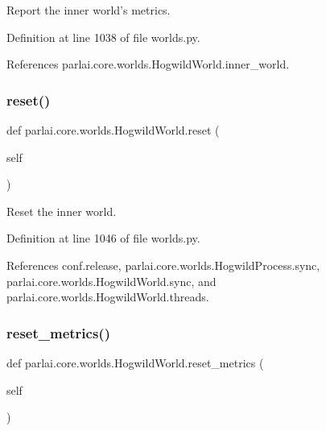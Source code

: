 \begin{DoxyVerb}Report the inner world's metrics.\end{DoxyVerb}
 

Definition at line 1038 of file worlds.\+py.



References parlai.\+core.\+worlds.\+Hogwild\+World.\+inner\+\_\+world.

\mbox{\label{classparlai_1_1core_1_1worlds_1_1HogwildWorld_ae72983e6af34391880979491ced1dde6}} 
\subsubsection{\texorpdfstring{reset()}{reset()}}
{\footnotesize\ttfamily def parlai.\+core.\+worlds.\+Hogwild\+World.\+reset (\begin{DoxyParamCaption}\item[{}]{self }\end{DoxyParamCaption})}

\begin{DoxyVerb}Reset the inner world.\end{DoxyVerb}
 

Definition at line 1046 of file worlds.\+py.



References conf.\+release, parlai.\+core.\+worlds.\+Hogwild\+Process.\+sync, parlai.\+core.\+worlds.\+Hogwild\+World.\+sync, and parlai.\+core.\+worlds.\+Hogwild\+World.\+threads.

\mbox{\label{classparlai_1_1core_1_1worlds_1_1HogwildWorld_ae57e2b90771c0feaa0496cb2885eae6d}} 
\subsubsection{\texorpdfstring{reset\+\_\+metrics()}{reset\_metrics()}}
{\footnotesize\ttfamily def parlai.\+core.\+worlds.\+Hogwild\+World.\+reset\+\_\+metrics (\begin{DoxyParamCaption}\item[{}]{self }\end{DoxyParamCaption})}

